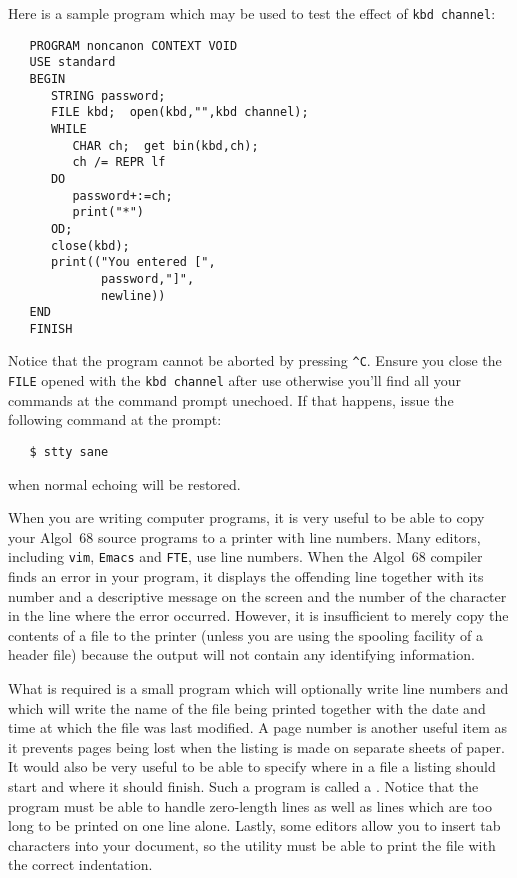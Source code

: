 Here is a sample program which may be used to test the effect of
\verb|kbd channel|:
\begin{verbatim}
   PROGRAM noncanon CONTEXT VOID
   USE standard
   BEGIN
      STRING password;
      FILE kbd;  open(kbd,"",kbd channel);
      WHILE
         CHAR ch;  get bin(kbd,ch);
         ch /= REPR lf
      DO
         password+:=ch;
         print("*")
      OD;
      close(kbd);
      print(("You entered [",
             password,"]",
             newline))
   END
   FINISH
\end{verbatim}
\noindent
Notice that the program cannot be aborted by pressing \verb|^C|. Ensure
you close the \verb|FILE| opened with the \verb|kbd channel| after use
otherwise you'll find all your commands at the command prompt unechoed.
If that happens, issue the following command at the prompt:
\begin{verbatim}
   $ stty sane
\end{verbatim}
\noindent
when normal echoing will be restored.

When you are writing computer programs, it is very useful to be able
to copy your Algol~68 source programs to a printer with line numbers.
Many editors, including \verb|vim|, \verb|Emacs| and \verb|FTE|, use
line numbers. When the Algol~68 compiler finds an error in your
program, it displays the offending line together with its number and
a descriptive message on the screen and the number of the character
in the line where the error occurred. However, it is insufficient to
merely copy the contents of a file to the printer (unless you are
using the spooling facility of a header file) because the output will
not contain any identifying information.

What is required is a small program which will optionally write line
numbers and which will write the name of the file being printed
together with the date and time at which the file was last modified.
A page number is another useful item as it prevents pages being lost
when the listing is made on separate sheets of paper. It would also
be very useful to be able to specify where in a file a listing should
start and where it should finish. Such a program is called a
. Notice that the program must be able to handle
zero-length lines as well as lines which are too long to be printed
on one line alone. Lastly, some editors allow you to insert tab
characters into your document, so the utility must be able to print
the file with the correct indentation.

